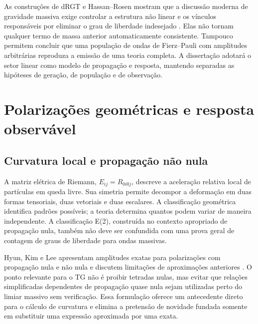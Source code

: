 As construções de dRGT e Hassan--Rosen mostram que a discussão moderna
de gravidade massiva exige controlar a estrutura não linear e os
vínculos responsáveis por eliminar o grau de liberdade indesejado
\autocite{derham2011,hassan2012}. Elas não tornam qualquer termo de massa
anterior automaticamente consistente. Tampouco permitem concluir que
uma população de ondas de Fierz--Pauli com amplitudes arbitrárias
reproduza a emissão de uma teoria completa. A dissertação adotará o
setor linear como modelo de propagação e resposta, mantendo separadas
as hipóteses de geração, de população e de observação.

\section{Polarizações geométricas e resposta observável}

\subsection{Curvatura local e propagação não nula}

A matriz elétrica de Riemann, \(E_{ij}=R_{0i0j}\), descreve a
aceleração relativa local de partículas em queda livre. Sua simetria
permite decompor a deformação em duas formas tensoriais, duas
vetoriais e duas escalares. A classificação geométrica identifica
padrões possíveis; a teoria determina quantos podem variar de maneira
independente. A classificação E(2), construída no contexto apropriado
de propagação nula, também não deve ser confundida com uma prova geral
de contagem de graus de liberdade para ondas massivas.

Hyun, Kim e Lee apresentam amplitudes exatas para polarizações com
propagação nula e não nula e discutem limitações de aproximações
anteriores \autocite{hyun2019}. O ponto relevante para o TG não é
proibir tetradas nulas, mas evitar que relações simplificadas dependentes
de propagação quase nula sejam utilizadas perto do limiar massivo sem
verificação. Essa formulação oferece um antecedente direto para o
cálculo de curvatura e elimina a pretensão de novidade fundada somente
em substituir uma expressão aproximada por uma exata.

